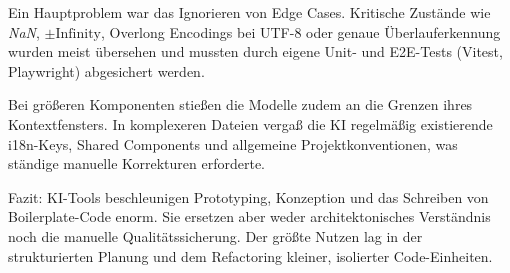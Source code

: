 Ein Hauptproblem war das Ignorieren von Edge Cases. Kritische Zustände wie \textit{NaN}, $\pm\text{Infinity}$, Overlong Encodings bei UTF-8 oder genaue Überlauferkennung wurden meist übersehen und mussten durch eigene Unit- und E2E-Tests (Vitest, Playwright) abgesichert werden.

Bei größeren Komponenten stießen die Modelle zudem an die Grenzen ihres Kontextfensters. In komplexeren Dateien vergaß die KI regelmäßig existierende i18n-Keys, Shared Components und allgemeine Projektkonventionen, was ständige manuelle Korrekturen erforderte.

Fazit: KI-Tools beschleunigen Prototyping, Konzeption und das Schreiben von Boilerplate-Code enorm. Sie ersetzen aber weder architektonisches Verständnis noch die manuelle Qualitätssicherung. Der größte Nutzen lag in der strukturierten Planung und dem Refactoring kleiner, isolierter Code-Einheiten.
